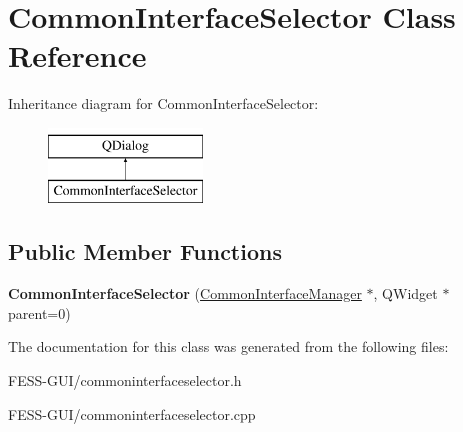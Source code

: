 \hypertarget{class_common_interface_selector}{}\section{Common\+Interface\+Selector Class Reference}
\label{class_common_interface_selector}
Inheritance diagram for Common\+Interface\+Selector\+:\begin{figure}[H]
\begin{center}
\leavevmode
\includegraphics[height=2.000000cm]{class_common_interface_selector}
\end{center}
\end{figure}
\subsection*{Public Member Functions}
\begin{DoxyCompactItemize}
\item 
\hypertarget{class_common_interface_selector_a46da3e73aa0868810dbd80a42281a6c8}{}\label{class_common_interface_selector_a46da3e73aa0868810dbd80a42281a6c8} 
{\bfseries Common\+Interface\+Selector} (\hyperlink{class_common_interface_manager}{Common\+Interface\+Manager} $\ast$, Q\+Widget $\ast$parent=0)
\end{DoxyCompactItemize}


The documentation for this class was generated from the following files\+:\begin{DoxyCompactItemize}
\item 
F\+E\+S\+S-\/\+G\+U\+I/commoninterfaceselector.\+h\item 
F\+E\+S\+S-\/\+G\+U\+I/commoninterfaceselector.\+cpp\end{DoxyCompactItemize}
